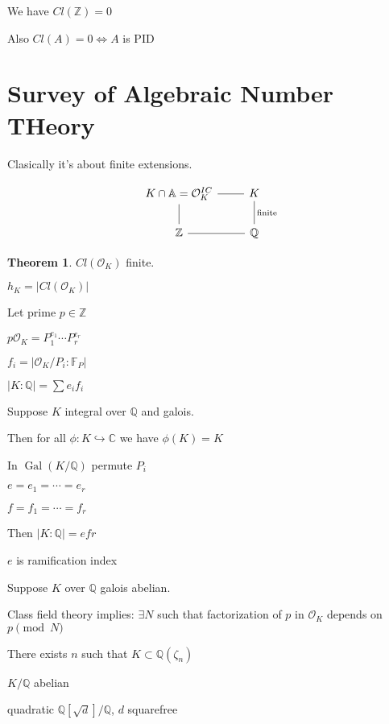 \documentclass{article}
\theoremstyle{definition}
\newtheorem{theorem}{Theorem}
\begin{document}
We have \(Cl(\mathbb{Z})=0\)

Also \(Cl(A)=0\iff A\) is PID

\section*{Survey of Algebraic Number THeory}

Clasically it's about finite extensions.

\[
    \begin{tikzcd}
        K\cap\mathbb{A} = \mathcal{O}_K^{IC} \ar[r, no head] \ar[d, no head] & K \ar[d, no head, "\text{finite}"] \\ \mathbb{Z} \ar[r, no head] & \mathbb{Q}
    \end{tikzcd}
\]

\begin{theorem}
    \(Cl(\mathcal{O}_K)\) finite.
\end{theorem}

\(h_K = \vert Cl(\mathcal{O}_K) \vert \) 

Let prime \(p\in\mathbb{Z}\) 

\(p \mathcal{O}_K = P_1^{e_1}\cdots P_r^{e_r}\)

\(f_i = \vert \mathcal{O}_K / P_i : \mathbb{F}_P \vert \)

\(\vert K : \mathbb{Q} \vert = \sum e_i f_i \) 

Suppose \(K\) integral over \(\mathbb{Q}\) and galois.

Then for all \(\phi:K\hookrightarrow\mathbb{C}\) we have \(\phi(K)=K\) 

\newcommand{\Gal}{\operatorname{Gal}}

In \(\Gal(K/\mathbb{Q})\)  permute \(P_i\) 

\(e = e_1 = \cdots = e_r\) 

\(f = f_1=\cdots=f_r\) 

Then \(\vert K : \mathbb{Q} \vert = efr \) 

\(e\) is ramification index

Suppose \(K\) over \(\mathbb{Q}\) galois abelian.

Class field theory implies: \(\exists N\) such that factorization of \(p\) in \(\mathcal{O}_K\) depends on \(p\pmod{N}\) 

There exists \(n\) such that \(K \subset \mathbb{Q}(\zeta_n)\) 

\(K / \mathbb{Q}\) abelian

quadratic \(\mathbb{Q}[\sqrt{d}] / \mathbb{Q}\), \(d\) squarefree
\end{document}
